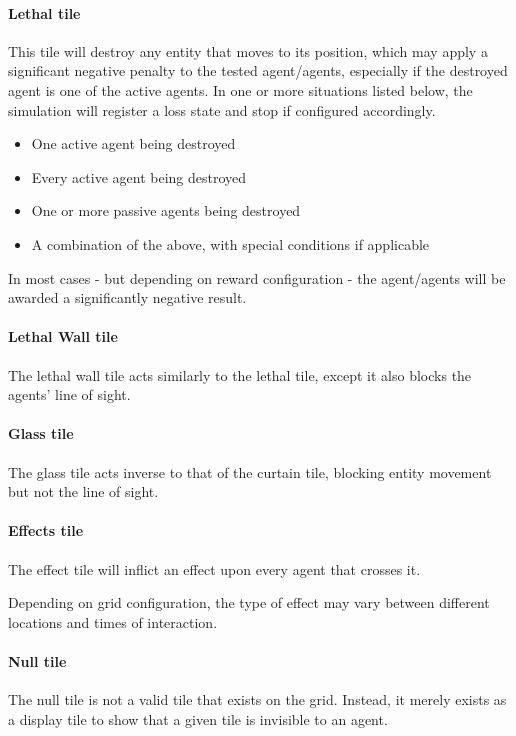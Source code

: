 \documentclass[masterthesis]{fer}
\begin{document}
\paragraph{Lethal tile}
This tile will destroy any entity that moves to its position, which may apply a significant negative penalty to the tested agent/agents, especially if the destroyed agent is one of the active agents. In one or more situations listed below, the simulation will register a loss state and stop if configured accordingly.
\begin{itemize}
\item One active agent being destroyed
\item Every active agent being destroyed
\item One or more passive agents being destroyed
\item A combination of the above, with special conditions if applicable
\end{itemize}
 In most cases - but depending on reward configuration - the agent/agents will be awarded a significantly negative result.

\paragraph{Lethal Wall tile}
The lethal wall tile acts similarly to the lethal tile, except it also blocks the agents' line of sight.

\paragraph{Glass tile}
The glass tile acts inverse to that of the curtain tile, blocking entity movement but not the line of sight.

\paragraph{Effects tile}
The effect tile will inflict an effect upon every agent that crosses it.

Depending on grid configuration, the type of effect may vary between different locations and times of interaction.

\paragraph{Null tile}
The null tile is not a valid tile that exists on the grid. Instead, it merely exists as a display tile to show that a given tile is invisible to an agent.
\end{document}
